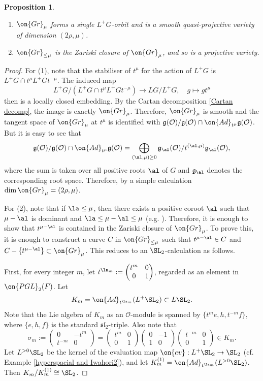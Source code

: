 \documentclass[]{pcmi}
\theoremstyle{plain}
\newtheorem{prop}[equation]{Proposition}
\theoremstyle{remark}
\theoremstyle{definition}
\newcommand{\frakg}{{\mathfrak g}}
\newcommand{\frakl}{{\mathfrak l}}
\newcommand{\fraks}{{\mathfrak s}}
\newcommand{\mO}{{\mathcal O}}
\newcommand{\Ad}{{\on{Ad}}}
\newcommand{\Gr}{{\on{Gr}}}
\begin{document}
\begin{prop}\label{geom of Sch}~
\begin{enumerate}
\item $\Gr_{\mu}$ forms a single $L^+G$-orbit and is a smooth quasi-projective variety of dimension $(2\rho,\mu)$.

\item $\Gr_{\leq \mu}$ is the Zariski closure of $\Gr_\mu$, and so is a projective variety.
\end{enumerate}
\end{prop}
\begin{proof}
For (1), note that the stabiliser of $t^\mu$ for the action of $L^+G$ is $L^+G\cap t^\mu L^+G t^{-\mu}$. The induced map
$$L^+G/(L^+G\cap t^\mu L^+G t^{-\mu}) \to LG/L^+G,\quad g \mapsto gt^\mu$$ then is a locally closed embedding. By the Cartan decomposition \eqref{Cartan decomp}, the image is exactly $\Gr_\mu$. Therefore, $\Gr_\mu$ is smooth and the tangent space of $\Gr_\mu$ at $t^\mu$ is identified with $\frakg(\mO)/\frakg(\mO)\cap \Ad_{t^\mu}\frakg(\mO)$. But it is easy to see that
\[\frakg(\mO)/\frakg(\mO)\cap \Ad_{t^\mu}\frakg(\mO)=\bigoplus_{(\al,\mu)\geq 0} \frakg_\al(\mO)/t^{(\al,\mu)}\frakg_\al(\mO),\]
where the sum is taken over all positive roots $\al$ of $G$ and $\frakg_\al$ denotes the corresponding root space. Therefore, by a simple calculation $\dim \Gr_\mu=(2\rho,\mu)$.

For  (2), note that if $\la\leq \mu$, then there exists a positive coroot $\al$ such that $\mu-\al$ is dominant and $\la\leq \mu-\al\leq \mu$ (e.g. \cite[Lemma 2.3]{R3}). Therefore, it is enough to show that $t^{\mu-\al}$ is contained in the Zariski closure of $\Gr_\mu$. To prove this, it is enough to construct a curve $C$ in $\Gr_{\leq\mu}$ such that $t^{\mu-\al}\in C$ and $C-\{t^{\mu-\al}\}\subset \Gr_\mu$. This reduces to an $\SL_2$-calculation as follows. 

First, for every integer $m$, let $t^{\la_m}:=\begin{pmatrix} t^m & 0\\ 0 &1\end{pmatrix}$, regarded as an element in $\on{PGL}_2(F)$. Let 
$$K_m=\Ad_{t^{\la_m}}(L^+\SL_2)\subset L\SL_2.$$  Note that the Lie algebra of $K_m$ as an $\mO$-module is spanned by $\{t^me, h, t^{-m}f\}$, where $\{e,h,f\}$ is the standard $\fraks\frakl_2$-triple. Also note that 
$$\sigma_m:=\begin{pmatrix}0&-t^m\\t^{-m}&0\end{pmatrix}=\begin{pmatrix} t^m & 0\\ 0 &1\end{pmatrix}\begin{pmatrix}0&-1\\1&0\end{pmatrix}\begin{pmatrix} t^{-m} & 0\\ 0 &1\end{pmatrix}\in K_m.$$
Let $L^{>0}\SL_2$ be the kernel of the evaluation map $\on{ev}:L^+\SL_2\to \SL_2$ (cf. Example \ref{hyperspacial and Iwahori2}), and let $K_m^{(1)}=\Ad_{t^{\la_m}}(L^{>0}\SL_2)$. Then $K_m/K_m^{(1)}\cong \SL_2$.



\end{proof}
\end{document}

